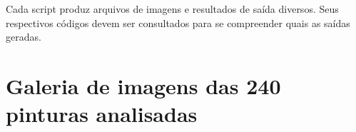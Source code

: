 Cada script produz arquivos de imagens e resultados de saída diversos. Seus
respectivos códigos devem ser consultados para se compreender quais as saídas
geradas.










\chapter{Galeria de imagens das 240 pinturas analisadas}
\label{cap:ap-galeria}

